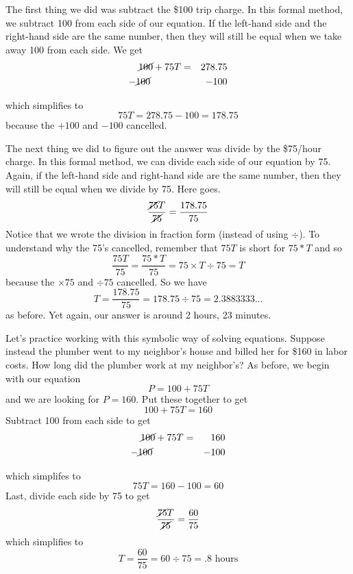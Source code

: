 The first thing we did was subtract the \$100 trip charge.  In this formal method, we subtract 100 from each side of our equation.  If the left-hand side and the right-hand side are the same number, then they will still be equal when we take away 100 from each side.  We get
\begin{eqnarray*}
\cancel{100} +75T & = & 278.75\\
-\cancel{100}\hspace{.4in}~& &  -100 \\  %
\end{eqnarray*} 
\vspace{-.5in} %

\noindent which simplifies to $$75T=278.75-100=178.75$$ because the $+100$ and $-100$ cancelled.  

\newpage %

The next thing we did to figure out the answer was divide by the \$75/hour charge.  In this formal method, we can divide each side of our equation by 75.  Again, if the left-hand side and right-hand side are the same number, then they will still be equal when we divide by 75.  Here goes.
$$\frac{\cancel{75}T}{\cancel{75}}=\frac{178.75}{75} $$
Notice that we wrote the division in fraction form (instead of using $\div$).  To understand why the 75's cancelled, remember that $75T$ is short for $75\ast T$ and so $$\frac{75T}{75} = \frac{75\ast T}{75} = 75 \times T \div 75=T$$ because the $\times 75$ and $\div 75$ cancelled.  So we have $$T = \frac{178.75}{75} = 178.75 \div 75 = 2.3883333\ldots$$ as before.  Yet again, our answer is around 2 hours, 23 minutes.

Let's practice working with this symbolic way of solving equations.  Suppose instead the plumber went to my neighbor's house and billed her for \$160 in labor costs.  How long did the plumber work at my neighbor's?  As before, we begin with our equation $$P = 100 + 75T$$  and we are looking for $P=160$.  Put these together to get $$100+75T =160$$ 
Subtract 100 from each side to get
\begin{eqnarray*}
\cancel{100} +75T & = & 160\\
-\cancel{100}\hspace{.4in}~& &  -100 \\  %
\end{eqnarray*} 
\vspace{-.5in} %

\noindent which simplifes to $$75T=160-100=60$$  
Last, divide each side by 75 to get $$\frac{\cancel{75}T}{\cancel{75}}=\frac{60}{75}$$ which simplifies to $$T = \frac{60}{75} = 60\div75=.8 \text{ hours}$$  

